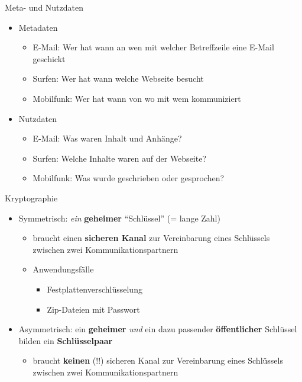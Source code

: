   \begin{frame}{Meta- und Nutzdaten}
    \begin{itemize}
      \item Metadaten
      \begin{itemize}
        \item E-Mail: Wer hat wann an wen mit welcher Betreffzeile eine E-Mail geschickt
        \item Surfen: Wer hat wann welche Webseite besucht
        \item Mobilfunk: Wer hat wann von wo mit wem kommuniziert
      \end{itemize}
      \item Nutzdaten
      \begin{itemize}
        \item E-Mail: Was waren Inhalt und Anhänge?
        \item Surfen: Welche Inhalte waren auf der Webseite?
        \item Mobilfunk: Was wurde geschrieben oder gesprochen?
      \end{itemize}
    \end{itemize}
  \end{frame}

  \begin{frame}{Kryptographie}
    \begin{itemize}
      \item Symmetrisch: \textit{ein} \textbf{geheimer} ``Schlüssel'' (= lange Zahl)
      \begin{itemize}
        \item braucht einen \textbf{sicheren Kanal} zur Vereinbarung eines Schlüssels zwischen zwei Kommunikationspartnern
        \item Anwendungsfälle
        \begin{itemize}
          \item Festplattenverschlüsselung
          \item Zip-Dateien mit Passwort
        \end{itemize}
      \end{itemize}
      \item Asymmetrisch: ein \textbf{geheimer} \textit{und} ein dazu passender \textbf{öffentlicher} Schlüssel bilden ein \textbf{Schlüsselpaar}
      \begin{itemize}
        \item braucht \textbf{keinen} (!!) sicheren Kanal zur Vereinbarung eines Schlüssels zwischen zwei Kommunikationspartnern
      \end{itemize}
    \end{itemize}
  \end{frame}

